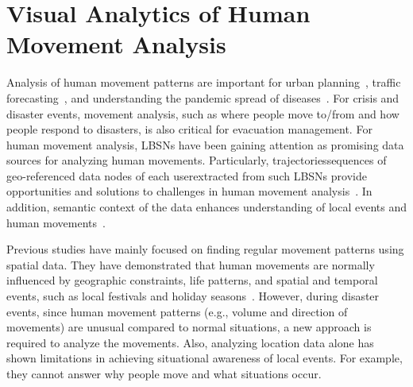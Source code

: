 \section{Visual Analytics of Human Movement Analysis}

Analysis of human movement patterns are important for urban planning~\cite{Zheng:2011:UCW}, traffic forecasting~\cite{Wei:2012:CPR}, and understanding the pandemic spread of diseases~\cite{Eubank:2004:Modelling}.
For crisis and disaster events, movement analysis, such as where people move to/from and how people respond to disasters, is also critical for evacuation management.
For human movement analysis, LBSNs have been gaining attention as promising data sources for analyzing human movements.
Particularly, trajectories\textemdash sequences of geo-referenced data nodes of each user\textemdash extracted from such LBSNs provide opportunities and solutions to challenges in human movement analysis~\cite{Andrienko:2009:Analysis, Fuchs:2013:Extracting, Gabrielli:2014:Tweets}.
In addition, semantic context of the data enhances understanding of local events and human movements~\cite{Hochman:2012:Visualizing, Zin:2013:Knowledge}.

Previous studies have mainly focused on finding regular movement patterns using spatial data.
They have demonstrated that human movements are normally influenced by geographic constraints, life patterns, and spatial and temporal events, such as local festivals and holiday seasons~\cite{Andrienko:2011:Movement, Fujisaka:2010:DOU}.
However, during disaster events, since human movement patterns (e.g., volume and direction of movements) are unusual compared to normal situations, a new approach is required to analyze the movements.
Also, analyzing location data alone has shown limitations in achieving situational awareness of local events.
For example, they cannot answer why people move and what situations occur.

